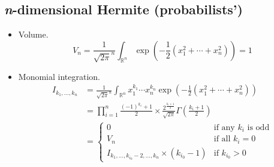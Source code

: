 \documentclass[draft]{scrartcl}
\begin{document}
\subsection*{\textit{n}-dimensional Hermite (probabilists')}
\begin{itemize}
  \item Volume.
    \begin{equation}
      V_n = \frac{1}{\sqrt{2\pi}^n} \int_{\mathbb{R}^n}
      \exp\left(-\frac{1}{2}(x_1^2+\cdots+x_n^2)\right) = 1
    \end{equation}


  \item Monomial integration.
  \begin{align}\nonumber
    I_{k_1,\dots,k_n}
      &= \frac{1}{\sqrt{2\pi}^n} \int_{\mathbb{R}^n} x_1^{k_1}\cdots x_n^{k_n}
      \exp\left(-\frac{1}{2}(x_1^2+\cdots+x_n^2)\right)\\
    &= \prod_{i=1}^n \frac{(-1)^{k_i} + 1}{2} \times
      \frac{2^{\frac{k_i+1}{2}}}{\sqrt{2\pi}} \Gamma\left(\frac{k_i+1}{2}\right)\\
    &=\begin{cases}
      0&\text{if any $k_i$ is odd}\\
      V_n&\text{if all $k_i=0$}\\
      I_{k_1,\dots,k_{i_0}-2,\dots,k_n} \times (k_{i_0} - 1)&\text{if $k_{i_0} > 0$}
    \end{cases}
  \end{align}
\end{itemize}
\end{document}
